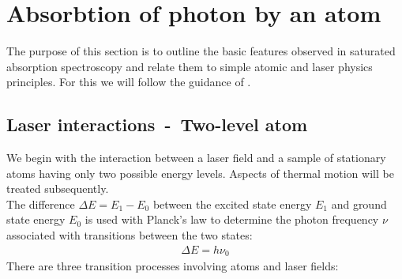 
\chapter{Absorbtion of photon by an atom}  %
The purpose of this section is to outline the basic features observed in saturated absorption
spectroscopy and relate them to simple atomic and laser physics principles.
For this we will follow the guidance of \citep{SAS}.

\ifpdf{}
    \graphicspath{{Chapter2/Figs/Raster/}{Chapter2/Figs/PDF/}{Chapter2/Figs/}}
\else
    \graphicspath{{Chapter2/Figs/Vector/}{Chapter2/Figs/}}
\fi



\section{Laser interactions~-~Two-level atom} %

We begin with the interaction between a laser field and a sample of stationary atoms having
only two possible energy levels. Aspects of thermal motion will be treated subsequently.\\
The difference \(\Delta E = E_1 - E_0\) between the excited state  energy \(E_1\) and
ground state  energy \(E_0\) is used with Planck's law to determine the photon frequency
\(\nu \) associated with transitions between the two states:
\begin{align}
    \Delta E = h \nu_0
\end{align}
There are three transition processes involving atoms and laser fields:
\bigskip

